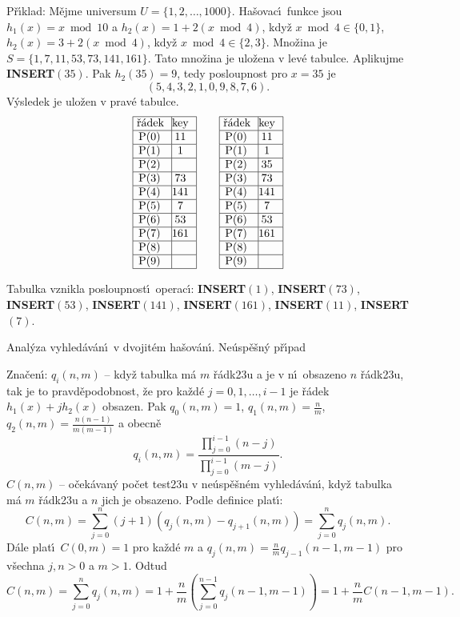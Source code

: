 \documentclass[a4paper,12pt]{article}
\begin{document}
\flushpar P\v r\'\i klad: M\v ejme universum $U=\{1,2,\dots,1000
\}$. 
Ha\v sovac\'\i\ funkce jsou 
$h_1(x)=x\bmod10$ a $h_2(x)=1+2(x\bmod4)$, kdy\v z 
$x\bmod4\in \{0,1\}$, $h_2(x)=3+2(x\bmod4)$, kdy\v z $x\bmod4\in 
\{2,3\}$. 
Mno\v zina je  $S=\{1,7,11,53,73,141,161\}$. Tato mno\v zina je ulo\v zena v 
lev\'e tabulce. Aplikujme {\bf INSERT$(35)$}. Pak $h_2(35)=9$, tedy 
posloupnost pro $x=35$ je 
$$(5,4,3,2,1,0,9,8,7,6).$$
V\'ysledek je ulo\v zen v prav\'e tabulce. 
$$\vbox {\hbox{\vtop{\offinterlineskip\halign{\strut\vrule\ # & \vrule\hfil# \hfil\vrule\cr\noalign{\hrule}\v r\'adek & key \hfil\cr\noalign{\hrule}P(0) & 11 \cr\noalign{\hrule}P(1) & 1 \cr\noalign{\hrule}P(2) & \hfill \cr\noalign{\hrule}P(3) & 73 \cr\noalign{\hrule}P(4) & 141 \cr\noalign{\hrule}P(5) & 7 \cr\noalign{\hrule}P(6) & 53 \cr\noalign{\hrule}P(7) & 161 \cr\noalign{\hrule}P(8) & \hfill\cr\noalign{\hrule}P(9) & \hfill \cr\noalign{\hrule}}}\qquad\vtop{\offinterlineskip\halign {\strut\vrule\ # & \vrule \hfil # \hfil \vrule\cr\noalign{\hrule}\v r\'adek & key \hfil \cr\noalign{\hrule}P(0) & 11 \cr\noalign{\hrule}P(1) & 1 \cr\noalign{\hrule}P(2) & 35 \cr\noalign{\hrule}P(3) & 73 \cr\noalign{\hrule}P(4) & 141 \cr\noalign{\hrule}P(5) & 7 \cr\noalign{\hrule}P(6) & 53 \cr\noalign{\hrule}P(7) & 161 \cr\noalign{\hrule}P(8) & \hfill \cr\noalign{\hrule}P(9) & \hfill \cr\noalign{\hrule}}}}}$$

\flushpar Tabulka vznikla posloupnost\'\i\ operac\'\i :\newline 
{\bf INSERT$(1)$}, {\bf INSERT$(73)$}, {\bf INSERT$(53)$}, 
{\bf INSERT$(141)$}, {\bf INSERT$(161)$},\newline 
{\bf INSERT$(11)$}, {\bf INSERT$(7)$}. 

\flushpar Anal\'yza vyhled\'av\'an\'\i\ v dvojit\'em ha\v sov\'an\'\i .
\medskip
\subhead
Ne\'usp\v e\v sn\'y p\v r\'\i pad
\endsubhead
\smallskip
 
\flushpar Zna\v cen\'\i :  $q_i(n,m)$ -- kdy\v z tabulka m\'a $m$ \v r\'adk\accent23u a 
je v n\'\i\ obsazeno $n$ \v r\'adk\accent23u, tak je to 
pravd\v epodobnost, \v ze pro ka\v zd\'e $j=0,1,\dots,i-1$ je 
\v r\'adek $h_1(x)+jh_2(x)$ obsazen. Pak $q_0(n,m)=1$, $q_1(n,m)=\frac 
nm$, 
$q_2(n,m)=\frac {n(n-1)}{m(m-1)}$ a obecn\v e 
$$q_i(n,m)=\frac {\prod_{j=0}^{i-1}(n-j)}{\prod_{j=0}^{i-1}(m-j)}
.$$
$C(n,m)$ -- o\v cek\'avan\'y po\v cet test\accent23u v ne\'usp\v e\v sn\'em 
vyhled\'av\'an\'\i , kdy\v z tabulka m\'a $m$ \v r\'adk\accent23u a $
n$ jich 
je obsazeno. Podle definice plat\'\i :
$$C(n,m)=\sum_{j=0}^n(j+1)(q_j(n,m)-q_{j+1}(n,m))=\sum_{j=0}^nq_j
(n,m).$$
D\'ale plat\'\i\ $C(0,m)=1$ pro ka\v zd\'e $m$ a 
$q_j(n,m)=\frac nmq_{j-1}(n-1,m-1)$ pro v\v sechna $j,n>0$ a $m>1$. 
Odtud
$$C(n,m)=\sum_{j=0}^nq_j(n,m)=1+\frac nm(\sum_{j=0}^{n-1}q_j(n-1,
m-1))=1+\frac nmC(n-1,m-1).$$
\end{document}
